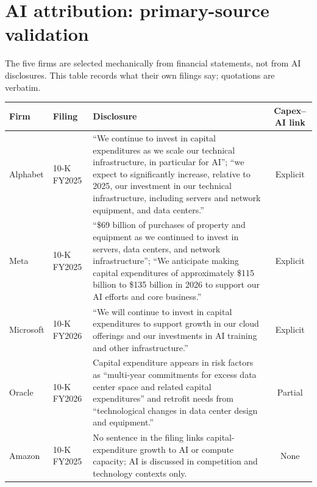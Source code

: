 \documentclass[preprint,11pt]{elsarticle}
\renewcommand{\arraystretch}{1.08}
\begin{document}
\clearpage
\appendix
\setcounter{section}{0}
\renewcommand{\thesection}{Appendix~\Alph{section}}
\renewcommand{\thetable}{\Alph{section}\arabic{table}}\setcounter{table}{0}

\section{AI attribution: primary-source validation}\label{app:ai}
The five firms are selected mechanically from financial statements, not from AI disclosures. This
table records what their own filings say; quotations are verbatim.

\begin{center}\footnotesize
\setlength{\tabcolsep}{4pt}
\renewcommand{\arraystretch}{1.15}
\begin{tabularx}{\linewidth}{@{}l l X c@{}}
\toprule
Firm & Filing & Disclosure & Capex--AI link \\
\midrule
Alphabet & 10-K FY2025 &
``We continue to invest in capital expenditures as we scale our technical infrastructure, in
particular for AI''; ``we expect to significantly increase, relative to 2025, our investment in our
technical infrastructure, including servers and network equipment, and data centers.'' & Explicit \\
\addlinespace[3pt]
Meta & 10-K FY2025 &
``\$69 billion of purchases of property and equipment as we continued to invest in servers, data
centers, and network infrastructure''; ``We anticipate making capital expenditures of approximately
\$115 billion to \$135 billion in 2026 to support our AI efforts and core business.'' & Explicit \\
\addlinespace[3pt]
Microsoft & 10-K FY2026 &
``We will continue to invest in capital expenditures to support growth in our cloud offerings and
our investments in AI training and other infrastructure.'' & Explicit \\
\addlinespace[3pt]
Oracle & 10-K FY2026 &
Capital expenditure appears in risk factors as ``multi-year commitments for excess data center space
and related capital expenditures'' and retrofit needs from ``technological changes in data center
design and equipment.'' & Partial \\
\addlinespace[3pt]
Amazon & 10-K FY2025 &
No sentence in the filing links capital-expenditure growth to AI or compute capacity; AI is
discussed in competition and technology contexts only. & None \\
\bottomrule
\end{tabularx}
\end{center}
\end{document}
